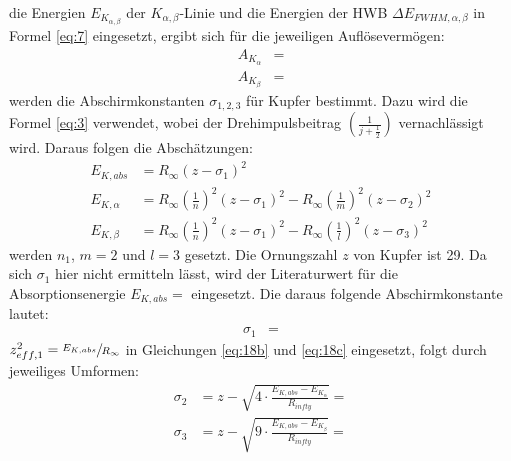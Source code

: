     \justifying die Energien $E_{K_{\alpha, \beta}}$ der $K_{\alpha,\beta}$-Linie und die Energien der HWB 
    $\Delta E_{FWHM, \alpha, \beta}$ in Formel \eqref{eq:7} eingesetzt, ergibt sich für die jeweiligen Auflösevermögen:
    \begin{subequations}\label{eq:17}
    \begin{align}
        A_{K_{\alpha}} &= \text{} \label{eq:17a}\\
        A_{K_{\beta}} &= \text{} \label{eq:17b}
    \end{align}
    \end{subequations}
    \justifying werden die Abschirmkonstanten $\sigma_{1,2,3}$ für Kupfer bestimmt. Dazu wird die Formel \eqref{eq:3}
    verwendet, wobei der Drehimpulsbeitrag $\left( \frac{1}{j+\frac{1}{2}} \right)$ vernachlässigt wird. Daraus folgen die Abschätzungen:
    \begin{subequations}\label{eq:18}
    \begin{align}
        E_{K,abs} &= R_{\infty} (z-\sigma_1)^2 \label{eq:18a}\\
        E_{K,\alpha} &= R_{\infty} \left( \frac{1}{n} \right)^2 (z-\sigma_1)^2 - R_{\infty} \left( \frac{1}{m} \right)^2 (z-\sigma_2)^2 \label{eq:18b}\\
        E_{K,\beta} &= R_{\infty} \left( \frac{1}{n} \right)^2 (z-\sigma_1)^2 - R_{\infty} \left( \frac{1}{l} \right)^2 (z-\sigma_3)^2 \label{eq:18c}
    \end{align}
    \end{subequations}
    \justifying werden $n_1$, $m=2$ und $l=3$ gesetzt. Die Ornungszahl $z$ von Kupfer ist 29. Da sich $\sigma_1$ hier nicht ermitteln lässt, 
    wird der Literaturwert für die Absorptionsenergie $E_{K,abs}= \text{}$ eingesetzt. Die daraus folgende 
    Abschirmkonstante lautet:
    \begin{align}
        \sigma_1 &= \text{} \label{eq:19}
    \end{align}
    \justifying $z_{eff,1}^2=\sfrac{E_{K,abs}}{R_{\infty}}$ in Gleichungen \eqref{eq:18b} und \eqref{eq:18c} eingesetzt,
    folgt durch jeweiliges Umformen:
    \begin{subequations}\label{eq:20}
    \begin{align}
        \sigma_2 &= z-\sqrt{4\cdot\frac{E_{K,abs}-E_{K_{\alpha}}}{R_{infty}}} = \text{} \label{eq:20a}\\
        \sigma_3 &= z-\sqrt{9\cdot\frac{E_{K,abs}-E_{K_{\beta}}}{R_{infty}}} = \text{} \label{eq:20b}
    \end{align}
    \end{subequations}

